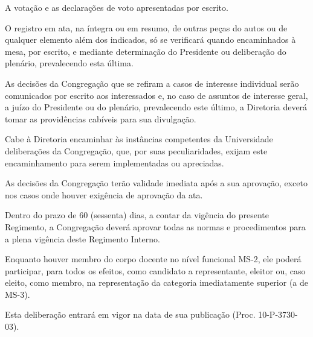 \documentclass{documento}
\begin{document}
\inciso A votação e as declarações de voto apresentadas por escrito.

\paragrafounico O registro em ata, na íntegra ou em resumo, de outras peças do autos ou de qualquer elemento além dos indicados, só se verificará quando encaminhados à mesa, por escrito, e mediante determinação do Presidente ou deliberação do plenário, prevalecendo esta última.

\artigo As decisões da Congregação que se refiram a casos de interesse individual serão comunicados por escrito aos interessados e, no caso de assuntos de interesse geral, a juízo do Presidente ou do plenário, prevalecendo este último, a Diretoria deverá tomar as providências cabíveis para sua divulgação.

\artigo Cabe à Diretoria encaminhar às instâncias competentes da Universidade deliberações da Congregação, que, por suas peculiaridades, exijam este encaminhamento para serem implementadas ou apreciadas.

\artigo As decisões da Congregação terão validade imediata após a sua aprovação, exceto nos casos onde houver exigência de aprovação da ata.


\artigo Dentro do prazo de 60 (sessenta) dias, a contar da vigência do presente Regimento, a Congregação deverá aprovar todas as normas e procedimentos para a plena vigência deste Regimento Interno.

\artigo Enquanto houver membro do corpo docente no nível funcional MS-2, ele poderá participar, para todos os efeitos, como candidato a representante, eleitor ou, caso eleito, como membro, na representação da categoria imediatamente superior (a de MS-3).

\artigo Esta deliberação entrará em vigor na data de sua publicação (Proc. 10-P-3730-03).
\end{document}
